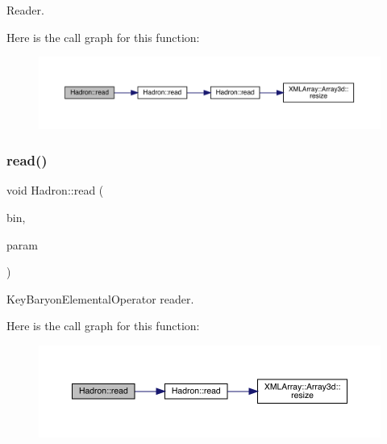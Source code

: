Reader. 

Here is the call graph for this function\+:
\nopagebreak
\begin{figure}[H]
\begin{center}
\leavevmode
\includegraphics[width=350pt]{d1/daf/namespaceHadron_a02133bc62e51d4baa57fb5ba0742ff43_cgraph}
\end{center}
\end{figure}
\mbox{\label{namespaceHadron_afb941d679afa3b1d65ca3048b28bc78c}} 
\subsubsection{\texorpdfstring{read()}{read()}\hspace{0.1cm}{\footnotesize\ttfamily [44/94]}}
{\footnotesize\ttfamily void Hadron\+::read (\begin{DoxyParamCaption}\item[{\mbox{\hyperlink{classADATIO_1_1BinaryReader}{Binary\+Reader}} \&}]{bin,  }\item[{\mbox{\hyperlink{structHadron_1_1KeyBaryonElementalOperator__t}{Key\+Baryon\+Elemental\+Operator\+\_\+t}} \&}]{param }\end{DoxyParamCaption})}



Key\+Baryon\+Elemental\+Operator reader. 

Here is the call graph for this function\+:
\nopagebreak
\begin{figure}[H]
\begin{center}
\leavevmode
\includegraphics[width=350pt]{d1/daf/namespaceHadron_afb941d679afa3b1d65ca3048b28bc78c_cgraph}
\end{center}
\end{figure}
\mbox{\label{namespaceHadron_a61a08fc66a0ee31593a2d5fff5657f7c}} 

